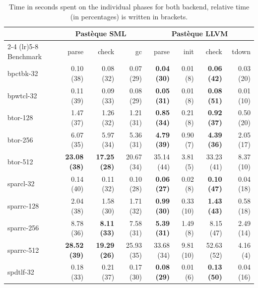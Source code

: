 \begin{table}[htbp]
  \centering
  \caption{Time in seconds spent on the individual phases for both backend, relative time (in percentages) is written in brackets.}
  \label{tab:phase-comparison}
  \small
  \setlength{\tabcolsep}{3pt}
  \begin{tabular}{l rrr rrrr}
    \toprule
    & \multicolumn{3}{c}{Pastèque SML} & \multicolumn{4}{c}{Pastèque LLVM} \\
    \cmidrule(lr){2-4} \cmidrule(lr){5-8}
    Benchmark & parse & check & gc & parse & init & check & tdown \\
    \midrule
    bpctbk-32 & 0.10 (38) & 0.08 (32) & 0.07 (29) & \textbf{0.04 (30)} & 0.01 (8) & \textbf{0.06 (42)} & 0.03 (20) \\
    bpwtcl-32 & 0.11 (39) & 0.09 (33) & 0.08 (29) & \textbf{0.05 (31)} & 0.01 (8) & \textbf{0.08 (51)} & 0.01 (10) \\
    btor-128 & 1.47 (37) & 1.26 (32) & 1.21 (31) & \textbf{0.85 (34)} & 0.21 (8) & \textbf{0.92 (37)} & 0.50 (20) \\
    btor-256 & 6.07 (35) & 5.97 (34) & 5.36 (31) & \textbf{4.79 (39)} & 0.90 (7) & \textbf{4.39 (36)} & 2.05 (17) \\
    btor-512 & \textbf{23.08 (38)} & \textbf{17.25 (28)} & 20.67 (34) & 35.14 (44) & 3.81 (5) & 33.23 (41) & 8.37 (10) \\
    sparcl-32 & 0.14 (40) & 0.11 (32) & 0.10 (28) & \textbf{0.06 (27)} & 0.02 (8) & \textbf{0.10 (47)} & 0.04 (18) \\
    sparrc-128 & 2.04 (38) & 1.58 (30) & 1.71 (32) & \textbf{0.99 (30)} & 0.33 (10) & \textbf{1.43 (43)} & 0.58 (18) \\
    sparrc-256 & 8.78 (36) & \textbf{8.11 (33)} & 7.58 (31) & \textbf{5.39 (31)} & 1.49 (8) & 8.15 (47) & 2.49 (14) \\
    sparrc-512 & \textbf{28.52 (39)} & \textbf{19.29 (26)} & 25.93 (35) & 33.68 (34) & 9.81 (10) & 52.63 (52) & 4.16 (4) \\
    spdtlf-32 & 0.18 (33) & 0.21 (37) & 0.17 (30) & \textbf{0.08 (29)} & 0.01 (6) & \textbf{0.13 (50)} & 0.04 (16) \\
    \bottomrule
  \end{tabular}
\end{table}
